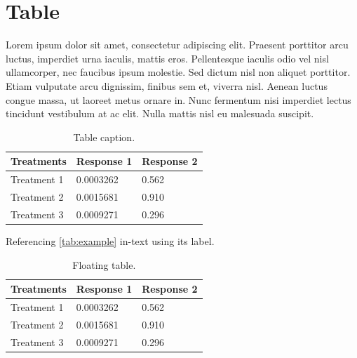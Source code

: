 \documentclass[
	11pt,
	fleqn,
	a4paper,
]{LegrandOrangeBook}
\begin{document}
\section{Table}

Lorem ipsum dolor sit amet, consectetur adipiscing elit. Praesent porttitor arcu luctus, imperdiet urna iaculis, mattis eros. Pellentesque iaculis odio vel nisl ullamcorper, nec faucibus ipsum molestie. Sed dictum nisl non aliquet porttitor. Etiam vulputate arcu dignissim, finibus sem et, viverra nisl. Aenean luctus congue massa, ut laoreet metus ornare in. Nunc fermentum nisi imperdiet lectus tincidunt vestibulum at ac elit. Nulla mattis nisl eu malesuada suscipit.

\begin{table}[H] %
    \centering %
    \begin{tabular}{L{0.15\textwidth} R{0.15\textwidth} R{0.15\textwidth}} %
        \toprule
        \textbf{Treatments} & \textbf{Response 1} & \textbf{Response 2} \\
        \midrule
        Treatment 1         & 0.0003262           & 0.562               \\
        Treatment 2         & 0.0015681           & 0.910               \\
        Treatment 3         & 0.0009271           & 0.296               \\
        \bottomrule
    \end{tabular}
    \caption{Table caption.}
    \label{tab:example} %
\end{table}

Referencing \autoref{tab:example} in-text using its label.

\begin{table}[t] %
    \centering %
    \begin{tabular}{L{0.15\textwidth} R{0.15\textwidth} R{0.15\textwidth}} %
        \toprule
        \textbf{Treatments} & \textbf{Response 1} & \textbf{Response 2} \\
        \midrule
        Treatment 1         & 0.0003262           & 0.562               \\
        Treatment 2         & 0.0015681           & 0.910               \\
        Treatment 3         & 0.0009271           & 0.296               \\
        \bottomrule
    \end{tabular}
    \caption{Floating table.}
    \label{tab:floating} %
\end{table}
\end{document}
